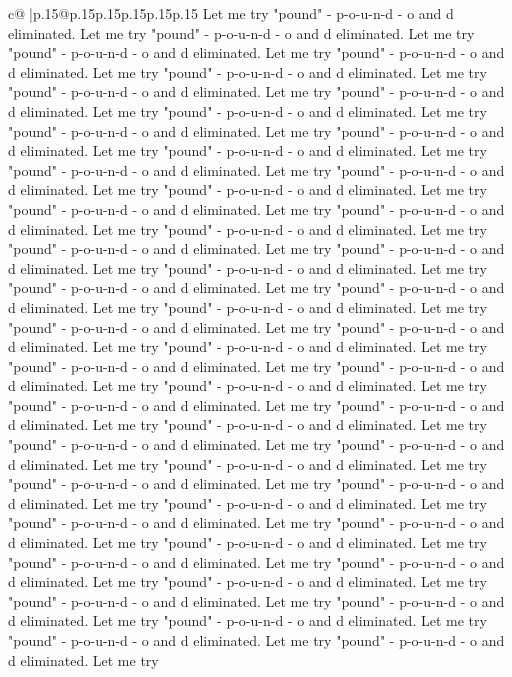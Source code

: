 \documentclass{article}
\begin{document}
{\begin{supertabular}{c@{$\;$}|p{.15\linewidth}@{}p{.15\linewidth}p{.15\linewidth}p{.15\linewidth}p{.15\linewidth}p{.15\linewidth}}
{{{Let me try "pound" {-} p{-}o{-}u{-}n{-}d {-} o and d eliminated. Let me try "pound" {-} p{-}o{-}u{-}n{-}d {-} o and d eliminated. Let me try "pound" {-} p{-}o{-}u{-}n{-}d {-} o and d eliminated. Let me try "pound" {-} p{-}o{-}u{-}n{-}d {-} o and d eliminated. Let me try "pound" {-} p{-}o{-}u{-}n{-}d {-} o and d eliminated. Let me try "pound" {-} p{-}o{-}u{-}n{-}d {-} o and d eliminated. Let me try "pound" {-} p{-}o{-}u{-}n{-}d {-} o and d eliminated. Let me try "pound" {-} p{-}o{-}u{-}n{-}d {-} o and d eliminated. Let me try "pound" {-} p{-}o{-}u{-}n{-}d {-} o and d eliminated. Let me try "pound" {-} p{-}o{-}u{-}n{-}d {-} o and d eliminated. Let me try "pound" {-} p{-}o{-}u{-}n{-}d {-} o and d eliminated. Let me try "pound" {-} p{-}o{-}u{-}n{-}d {-} o and d eliminated. Let me try "pound" {-} p{-}o{-}u{-}n{-}d {-} o and d eliminated. Let me try "pound" {-} p{-}o{-}u{-}n{-}d {-} o and d eliminated. Let me try "pound" {-} p{-}o{-}u{-}n{-}d {-} o and d eliminated. Let me try "pound" {-} p{-}o{-}u{-}n{-}d {-} o and d eliminated. Let me try "pound" {-} p{-}o{-}u{-}n{-}d {-} o and d eliminated. Let me try "pound" {-} p{-}o{-}u{-}n{-}d {-} o and d eliminated. Let me try "pound" {-} p{-}o{-}u{-}n{-}d {-} o and d eliminated. Let me try "pound" {-} p{-}o{-}u{-}n{-}d {-} o and d eliminated. Let me try "pound" {-} p{-}o{-}u{-}n{-}d {-} o and d eliminated. Let me try "pound" {-} p{-}o{-}u{-}n{-}d {-} o and d eliminated. Let me try "pound" {-} p{-}o{-}u{-}n{-}d {-} o and d eliminated. Let me try "pound" {-} p{-}o{-}u{-}n{-}d {-} o and d eliminated. Let me try "pound" {-} p{-}o{-}u{-}n{-}d {-} o and d eliminated. Let me try "pound" {-} p{-}o{-}u{-}n{-}d {-} o and d eliminated. Let me try "pound" {-} p{-}o{-}u{-}n{-}d {-} o and d eliminated. Let me try "pound" {-} p{-}o{-}u{-}n{-}d {-} o and d eliminated. Let me try "pound" {-} p{-}o{-}u{-}n{-}d {-} o and d eliminated. Let me try "pound" {-} p{-}o{-}u{-}n{-}d {-} o and d eliminated. Let me try "pound" {-} p{-}o{-}u{-}n{-}d {-} o and d eliminated. Let me try "pound" {-} p{-}o{-}u{-}n{-}d {-} o and d eliminated. Let me try "pound" {-} p{-}o{-}u{-}n{-}d {-} o and d eliminated. Let me try "pound" {-} p{-}o{-}u{-}n{-}d {-} o and d eliminated. Let me try "pound" {-} p{-}o{-}u{-}n{-}d {-} o and d eliminated. Let me try "pound" {-} p{-}o{-}u{-}n{-}d {-} o and d eliminated. Let me try "pound" {-} p{-}o{-}u{-}n{-}d {-} o and d eliminated. Let me try "pound" {-} p{-}o{-}u{-}n{-}d {-} o and d eliminated. Let me try "pound" {-} p{-}o{-}u{-}n{-}d {-} o and d eliminated. Let me try "pound" {-} p{-}o{-}u{-}n{-}d {-} o and d eliminated. Let me try "pound" {-} p{-}o{-}u{-}n{-}d {-} o and d eliminated. Let me try "pound" {-} p{-}o{-}u{-}n{-}d {-} o and d eliminated. Let me try "pound" {-} p{-}o{-}u{-}n{-}d {-} o and d eliminated. Let me try "pound" {-} p{-}o{-}u{-}n{-}d {-} o and d eliminated. Let me try "pound" {-} p{-}o{-}u{-}n{-}d {-} o and d eliminated. Let me try "pound" {-} p{-}o{-}u{-}n{-}d {-} o and d eliminated. Let me try "pound" {-} p{-}o{-}u{-}n{-}d {-} o and d eliminated. Let me try "pound" {-} p{-}o{-}u{-}n{-}d {-} o and d eliminated. Let me try "pound" {-} p{-}o{-}u{-}n{-}d {-} o and d eliminated. Let me try }}}
\end{supertabular}}
\end{document}
